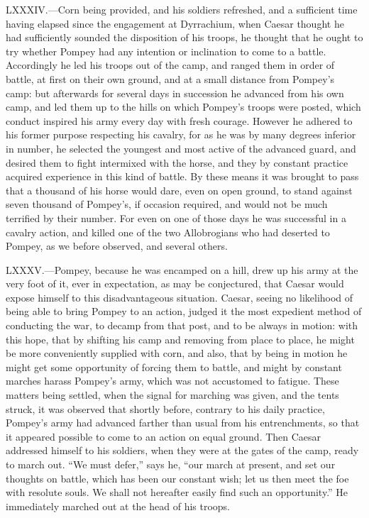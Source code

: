 LXXXIV.—Corn being provided, and his soldiers refreshed, and a
sufficient time having elapsed since the engagement at Dyrrachium, when
Caesar thought he had sufficiently sounded the disposition of his
troops, he thought that he ought to try whether Pompey had any intention
or inclination to come to a battle. Accordingly he led his troops out of
the camp, and ranged them in order of battle, at first on their own
ground, and at a small distance from Pompey's camp: but afterwards for
several days in succession he advanced from his own camp, and led them
up to the hills on which Pompey's troops were posted, which conduct
inspired his army every day with fresh courage. However he adhered to
his former purpose respecting his cavalry, for as he was by many degrees
inferior in number, he selected the youngest and most active of the
advanced guard, and desired them to fight intermixed with the horse, and
they by constant practice acquired experience in this kind of battle. By
these means it was brought to pass that a thousand of his horse would
dare, even on open ground, to stand against seven thousand of Pompey's,
if occasion required, and would not be much terrified by their number.
For even on one of those days he was successful in a cavalry action, and
killed one of the two Allobrogians who had deserted to Pompey, as we
before observed, and several others.

LXXXV.—Pompey, because he was encamped on a hill, drew up his army at
the very foot of it, ever in expectation, as may be conjectured, that
Caesar would expose himself to this disadvantageous situation. Caesar,
seeing no likelihood of being able to bring Pompey to an action, judged
it the most expedient method of conducting the war, to decamp from that
post, and to be always in motion: with this hope, that by shifting his
camp and removing from place to place, he might be more conveniently
supplied with corn, and also, that by being in motion he might get some
opportunity of forcing them to battle, and might by constant marches
harass Pompey's army, which was not accustomed to fatigue. These matters
being settled, when the signal for marching was given, and the tents
struck, it was observed that shortly before, contrary to his daily
practice, Pompey's army had advanced farther than usual from his
entrenchments, so that it appeared possible to come to an action on
equal ground. Then Caesar addressed himself to his soldiers, when they
were at the gates of the camp, ready to march out. ``We must defer,'' says
he, ``our march at present, and set our thoughts on battle, which has
been our constant wish; let us then meet the foe with resolute souls. We
shall not hereafter easily find such an opportunity.'' He immediately
marched out at the head of his troops.

